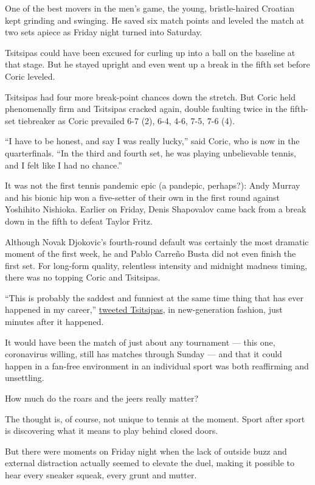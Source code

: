 One of the best movers in the men's game, the young, bristle-haired
Croatian kept grinding and swinging. He saved six match points and
leveled the match at two sets apiece as Friday night turned into
Saturday.

Tsitsipas could have been excused for curling up into a ball on the
baseline at that stage. But he stayed upright and even went up a break
in the fifth set before Coric leveled.

Tsitsipas had four more break-point chances down the stretch. But Coric
held phenomenally firm and Tsitsipas cracked again, double faulting
twice in the fifth-set tiebreaker as Coric prevailed 6-7 (2), 6-4, 4-6,
7-5, 7-6 (4).

``I have to be honest, and say I was really lucky,'' said Coric, who is
now in the quarterfinals. ``In the third and fourth set, he was playing
unbelievable tennis, and I felt like I had no chance.''

It was not the first tennis pandemic epic (a pandepic, perhaps?): Andy
Murray and his bionic hip won a five-setter of their own in the first
round against Yoshihito Nishioka. Earlier on Friday, Denis Shapovalov
came back from a break down in the fifth to defeat Taylor Fritz.

Although Novak Djokovic's fourth-round default was certainly the most
dramatic moment of the first week, he and Pablo Carreño Busta did not
even finish the first set. For long-form quality, relentless intensity
and midnight madness timing, there was no topping Coric and Tsitsipas.

``This is probably the saddest and funniest at the same time thing that
has ever happened in my career,''
\href{https://twitter.com/StefTsitsipas/status/1302112839906349056}{tweeted
Tsitsipas}, in new-generation fashion, just minutes after it happened.

It would have been the match of just about any tournament --- this one,
coronavirus willing, still has matches through Sunday --- and that it
could happen in a fan-free environment in an individual sport was both
reaffirming and unsettling.

How much do the roars and the jeers really matter?

The thought is, of course, not unique to tennis at the moment. Sport
after sport is discovering what it means to play behind closed doors.

But there were moments on Friday night when the lack of outside buzz and
external distraction actually seemed to elevate the duel, making it
possible to hear every sneaker squeak, every grunt and mutter.

